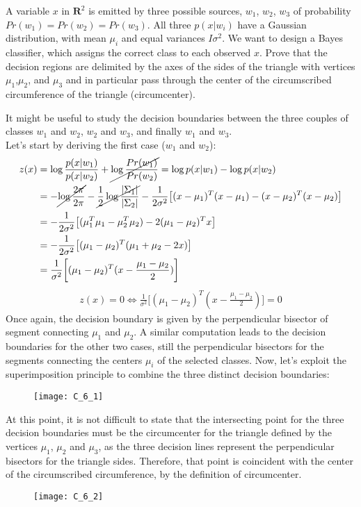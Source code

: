 \Exercise[number={6}]
A variable \(x\) in \(\mathbf{R}^2\) is emitted by three possible sources,
\(w_1\), \(w_2\), \(w_3\) of probability \(Pr(w_1)=Pr(w_2)=Pr(w_3)\). 
All three \(p(x|w_i)\) have a Gaussian distribution, with
mean \(\mu_i\) and equal variances \(I\sigma^2\). We want to design a Bayes
classifier, which assigns the correct class to each observed \(x\).
Prove that the decision regions are delimited by the axes of the sides of the
triangle with vertices \(\mu_1\),\(\mu_2\), and \(\mu_3\) and in particular
pass through the center of the circumscribed circumference of the triangle
(circumcenter).

\Answer[number={6}]
It might be useful to study the decision boundaries between the three
couples of classes \(w_1\) and \(w_2\), \(w_2\) and \(w_3\), and
finally \(w_1\) and \(w_3\).\\
Let's start by deriving the first case (\(w_1\) and \(w_2\)):
\begin{align*}
    z(x)
    &=\log{\frac{p(x|w_1)}{p(x|w_2)}} + \cancel{\log{\frac{Pr(w_1)}{Pr(w_2)}}}
    =\log{p(x|w_1)}-\log{p(x|w_2)}\\
    &=-\cancel{\log{\frac{2\pi}{2\pi}}}-\cancel{\frac{1}{2}\log{\frac{|\Sigma_1|}{|\Sigma_2|}}}-\frac{1}{2\sigma^2}\bigl[(x-\mu_1)^T(x-\mu_1)-(x-\mu_2)^T(x-\mu_2)\bigr]\\
    &=-\frac{1}{2\sigma^2}\bigl[(\mu_1^T\mu_1-\mu_2^T\mu_2)-2(\mu_1-\mu_2)^Tx\bigr]\\
    &=-\frac{1}{2\sigma^2}\bigl[(\mu_1-\mu_2)^T(\mu_1+\mu_2-2x)\bigr]\\
    &=\frac{1}{\sigma^2}\biggl[(\mu_1-\mu_2)^T(x-\frac{\mu_1-\mu_2}{2})\biggr]
\end{align*}
\begin{align*}
    z(x)=0 \Longleftrightarrow \frac{1}{\sigma^2}\biggl[(\mu_1-\mu_2)^T(x-\frac{\mu_1-\mu_2}{2})\biggr]=0
\end{align*}
Once again, the decision boundary is given by the perpendicular bisector
of segment connecting \(\mu_1\) and \(\mu_2\).
A similar computation leads to the decision boundaries for the other two
cases, still the perpendicular bisectors for the segments connecting the
centers \(\mu_i\) of the selected classes.
Now, let's exploit the superimposition principle to combine the three
distinct decision boundaries:
\begin{figure}[H]
    \texttt{[image: C\_6\_1]}
    \centering
\end{figure}
At this point, it is not difficult to state that the intersecting point
for the three decision boundaries must be the circumcenter for the
triangle defined by the vertices \(\mu_1\), \(\mu_2\) and \(\mu_3\),
as the three decision lines represent the perpendicular bisectors
for the triangle sides. Therefore, that point is coincident with the center
of the circumscribed circumference, by the definition of circumcenter.
\begin{figure}[H]
    \texttt{[image: C\_6\_2]}
    \centering
\end{figure}